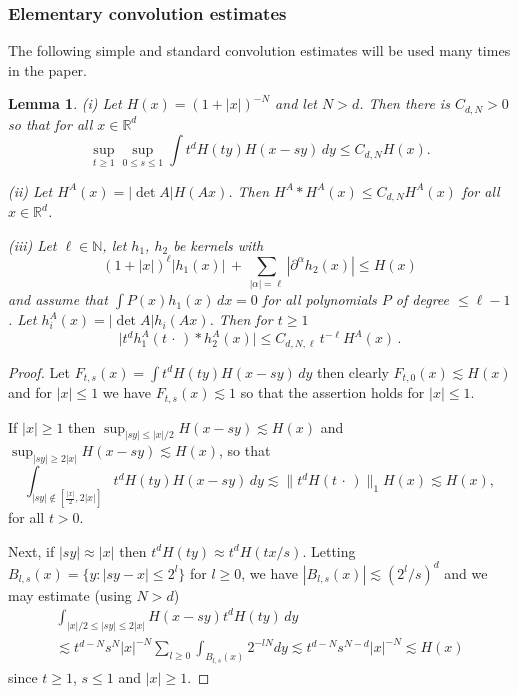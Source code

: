 \documentclass[11pt]{amsart}
\newtheorem{lemma}[theorem]{Lemma}
\theoremstyle{definition}
\numberwithin{theorem}{section}
\numberwithin{definition}{section}
\newcommand{\Be}{\begin{equation}}
\newcommand{\Ee}{\end{equation}}
\newcommand{\note}[1]{\footnote{\texttt{\Small #1}}}
\def\lc{\lesssim}
\def\fM{{\mathfrak {M}}}
\def\bbN{{\mathbb {N}}}
\def\bbR{{\mathbb {R}}}
\def\cK{{\mathcal {K}}}
\begin{document}


\subsubsection*{Elementary  convolution estimates}
The following simple and standard
convolution estimates will be used many times in the paper.

\begin{lemma}\label{prelptwise}
(i)   Let $H(x)=(1+|x|)^{-N}$ and let $N>d$.
Then there is $C_{d,N}>0$ so that for all $x\in \bbR^d$
\Be\sup_{t\ge 1} \sup_{0\le s\le 1} \int t^dH(t y)H(x-sy)\,dy
\le C_{d,N} H(x).\Ee

\noindent (ii) Let  $H^A(x)= |\det A| H(Ax)$. Then  $H^A*H^A(x) \le C_{d,N} H^A(x)$  for all $x\in \bbR^d$.

\noindent (iii) Let $\ell\in \bbN$,  let $h_1$, $h_2$ be kernels with
$$(1+|x|)^\ell |h_1(x)| \,+\, \sum_{|\alpha|=\ell} |\partial^{\alpha} h_2(x)|\le H(x)$$
and assume that
$\int P(x) h_1(x)\,dx=0$ for all polynomials $P$ of degree
$\le  \ell-1$.
Let $h_i^A(x) =|\det A| h_i(Ax)$.
Then for $t\ge 1$
$$\big| t^dh_1^A(t\,\cdot\,) * h_2^A (x)| \le C_{d,N,\ell} \,t^{-\ell}  H^A(x)\,.$$
\end{lemma}\begin{proof}
Let $F_{t,s}(x)=\int t^dH(t y)H(x-sy)\,dy $ then clearly $F_{t,0}(x)\lc H(x)$ and
for $|x|\le 1$ we have $F_{t,s}(x)\lc 1$ so that
the assertion holds for $|x|\le 1$.

If $|x|\ge 1$ then $\sup_{|sy|\le |x|/2}H(x-sy) \lc H(x)$ and
$\sup_{|sy|\ge 2|x|}H(x-sy) \lc H(x)$, so that
$$
\int_{|sy|\notin [\frac{|x|}{2}, 2|x|]} t^d H(ty)H(x-sy)\,dy \lc
 \|t^d H(t\,\cdot\,)\|_{1}H(x) \lc H(x),
$$ for all $t>0$.

Next, if $|sy|\approx |x|$ then
$t^d H(ty)  \approx t^d H(tx/s)$. Letting
$B_{l,s}(x)=\{y:|sy-x|\le 2^l\}$ for $l\ge 0$, we have $|B_{l,s}(x)|\lc (2^l/s)^d$
and we may estimate (using $N>d$)
\begin{multline*}
\int_{|x|/2\le |sy|\le 2|x|} H(x-sy) t^d H(ty)\,dy\\
\lc  t^{d-N}s^N|x|^{-N}\sum_{l\ge 0}
\int_{B_{l,s}(x)} 2^{-lN} dy \lc t^{d-N}s^{N-d} |x|^{-N} \lc H(x)
\end{multline*}
since $t\ge 1$, $s\le 1$ and $|x|\ge 1$.


\end{proof}
\end{document}
